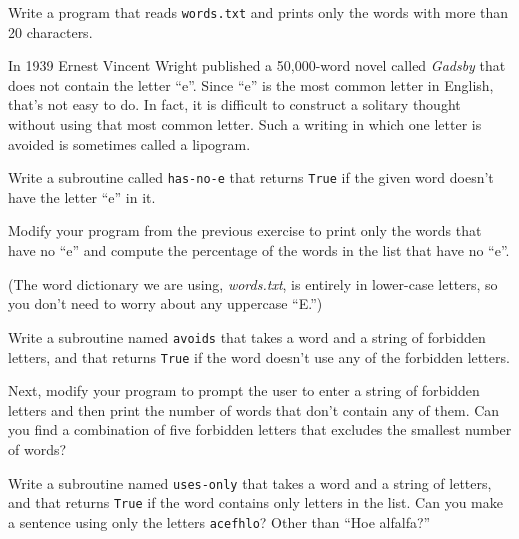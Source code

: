 \begin{exercise}
Write a program that reads {\tt words.txt} and prints only the
words with more than 20 characters.

\end{exercise}

\begin{exercise}

In 1939 Ernest Vincent Wright published a 50,000-word novel 
called {\em Gadsby} that does not contain the letter ``e''. 
Since ``e'' is the most common letter in English, that's 
not easy to do. In fact, it is difficult to construct a 
solitary thought without using that most common letter. 
Such a  writing in which one letter is avoided is sometimes 
called a lipogram.

Write a subroutine called \verb"has-no-e" that returns 
{\tt True} if the given word doesn't have the letter ``e'' 
in it.
\label{no_e}

Modify your program from the previous exercise to print only 
the words that have no ``e'' and compute the percentage of 
the words in the list that have no ``e''.

(The word dictionary we are using, \emph{words.txt}, is 
entirely in lower-case letters, so you don't need to 
worry about any uppercase ``E.'')



\end{exercise}


\begin{exercise} 

Write a subroutine named {\tt avoids}
that takes a word and a string of forbidden letters, and
that returns {\tt True} if the word doesn't use any of 
the forbidden letters.

Next, modify your program to prompt the user to enter a string
of forbidden letters and then print the number of words that
don't contain any of them.
Can you find a combination of five forbidden letters that
excludes the smallest number of words?

\end{exercise}



\begin{exercise}

Write a subroutine named \verb"uses-only" that takes a word and a
string of letters, and that returns {\tt True} if the word contains
only letters in the list.  Can you make a sentence using only the
letters {\tt acefhlo}?  Other than ``Hoe alfalfa?''

\end{exercise}


